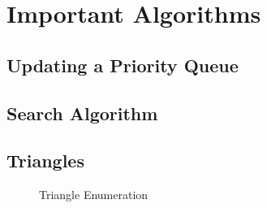 \chapter{Important Algorithms}

\section{Updating a Priority Queue}

\section{Search Algorithm}

\newpage
\section{Triangles}

\begin{figure}
    \centering
    
    \caption{Triangle Enumeration}
    \label{fig:triangel enumeration}
\end{figure}

